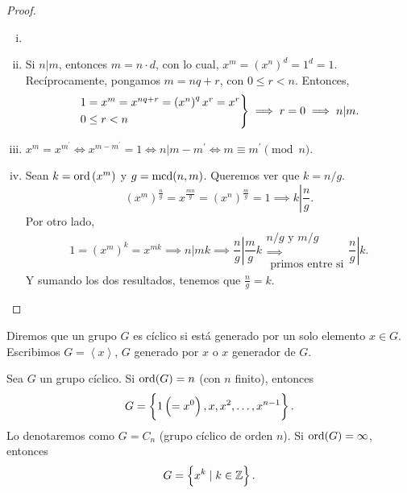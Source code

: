 \begin{proof}
    \begin{enumerate}[i)]
        \item[]
        \item Si $n \vert m$, entonces $m = n \cdot d$, con lo cual, $x^m = \left( x^n \right)^d = 1^d = 1$. Recíprocamente, pongamos $m = nq + r$, con $0 \leq r < n$. Entonces,
            \[
                \begin{rcases}
                    1 = x^m = x^{nq + r} = \left( x^n \right)^q x^r = x^r \\
                    0 \leq r < n
                \end{rcases}
                \implies r = 0 \implies n \vert m.
            \]
        \item $x^m = x^{m^\prime} \iff x^{m - m^\prime} = 1 \iff n \vert m - m^\prime \iff
            m \equiv m^\prime \pmod{n}$.
        \item Sean $k = \operatorname{ord}\left( x^m \right)$ y $g = \operatorname{mcd}(n, m)$. Queremos ver que $k = n/g$.
            \[
                \left( x^m \right)^{\frac{n}{g}} = x^{\frac{mn}{g}} = \left( x^n \right)^{\frac{m}{g}} = 1
                \implies k \left\vert \frac{n}{g} \right. .
            \]
            Por otro lado,
            \[
                1 = \left( x^m \right)^k = x^{mk} \implies n \vert mk \implies \left.\frac{n}{g} \right\vert \frac{m}{g} k
                \substack{n/g \text{ y } m/g \\ \implies \\ \text{ primos entre si}} \left.\frac{n}{g} \right\vert k.
            \]
            Y sumando los dos resultados, tenemos que $\frac{n}{g} = k$.
    \end{enumerate}
\end{proof}

\begin{defi}
    Diremos que un grupo $G$ es cíclico si está generado por un solo elemento $x \in G$. Escribimos $G = \left< x \right>$, $G$
    generado por $x$ o $x$ generador de $G$.
\end{defi}

\begin{obs}
    Sea $G$ un grupo cíclico. Si $\operatorname{ord}(G) = n$ (con $n$ finito), entonces
    \[
        G = \left\{ 1 \left( = x^0 \right), x, x^2, \dots, x^{n-1}\right\}.
    \]
    Lo denotaremos como $G = C_n$ (grupo cíclico de orden $n$).
    Si $\operatorname{ord}(G) = \infty$, entonces
    \[
        G = \left\{x^k \mid k \in \mathbb{Z}\right\}.
    \]
\end{obs}

